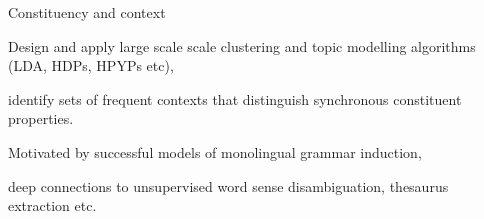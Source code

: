 \documentclass{beamer}
\newenvironment{unpacked_itemize}{
\begin{itemize}
  \setlength{\itemsep}{10pt}
  \setlength{\parskip}{0pt}
  \setlength{\parsep}{0pt}
}{\end{itemize}}
\begin{document}
\begin{frame}[t]{Constituency and context}
\begin{center}
{}
\end{center}
\vspace{0.1in}
\begin{unpacked_itemize}
\item Design and apply large scale scale clustering and topic modelling algorithms (LDA, HDPs, HPYPs etc), 
\item identify sets of frequent contexts that distinguish synchronous constituent properties.
\item Motivated by successful models of monolingual grammar induction,
\item deep connections to unsupervised word sense disambiguation, thesaurus extraction etc.
\end{unpacked_itemize}
\end{frame}
\end{document}
